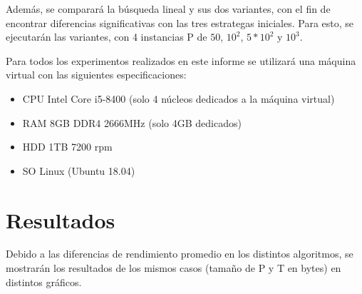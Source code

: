 \documentclass[11pt]{article}
\begin{document}
Además, se comparará la búsqueda lineal y sus dos variantes, con el fin de encontrar diferencias significativas con las tres estrategas iniciales. Para esto, se ejecutarán las variantes, con 4 instancias P de $50$, $10^2$, $5*10^2$ y $10^3$.

Para todos los experimentos realizados en este informe se utilizará una máquina virtual con las siguientes especificaciones:
\begin{itemize}
    \item CPU Intel Core i5-8400 (solo 4 núcleos dedicados a la máquina virtual)
    \item RAM 8GB DDR4 2666MHz (solo 4GB dedicados)
    \item HDD 1TB 7200 rpm
    \item SO Linux (Ubuntu 18.04)
\end{itemize}


\newpage
\section{Resultados}
 
Debido a las diferencias de rendimiento promedio en los distintos algoritmos, se mostrarán los resultados de los mismos casos (tamaño de P y T en bytes) en distintos gráficos.
 
\end{document}
